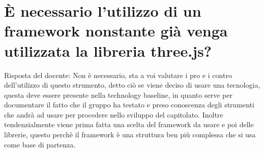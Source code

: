 \section{È necessario l'utilizzo di un framework nonstante già venga utilizzata la libreria three.js?}
Risposta del docente: Non è necessario, sta a voi valutare i pro e i contro dell'utilizzo di questo strumento, detto ciò se viene deciso di usare una tecnologia, questa deve essere presente nella technology baseline, in quanto serve per documentare il fatto che il gruppo ha testato e preso conoscenza degli strumenti che andrà ad usare per procedere nello sviluppo del capitolato. Inoltre tendenzialmente viene prima fatta una scelta del framework da usare e poi delle librerie, questo perchè il framework è una struttura ben più complessa che si usa come base di partenza.